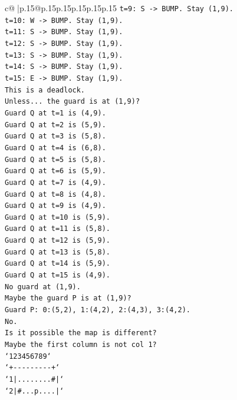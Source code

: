 \documentclass{article}
\begin{document}
{\begin{supertabular}{c@{$\;$}|p{.15\linewidth}@{}p{.15\linewidth}p{.15\linewidth}p{.15\linewidth}p{.15\linewidth}p{.15\linewidth}}
{{{\texttt{t=9: S {-}> BUMP. Stay (1,9).} \\
\texttt{t=10: W {-}> BUMP. Stay (1,9).} \\
\texttt{t=11: S {-}> BUMP. Stay (1,9).} \\
\texttt{t=12: S {-}> BUMP. Stay (1,9).} \\
\texttt{t=13: S {-}> BUMP. Stay (1,9).} \\
\texttt{t=14: S {-}> BUMP. Stay (1,9).} \\
\texttt{t=15: E {-}> BUMP. Stay (1,9).} \\
\texttt{This is a deadlock.} \\
\texttt{Unless... the guard is at (1,9)?} \\
\texttt{Guard Q at t=1 is (4,9).} \\
\texttt{Guard Q at t=2 is (5,9).} \\
\texttt{Guard Q at t=3 is (5,8).} \\
\texttt{Guard Q at t=4 is (6,8).} \\
\texttt{Guard Q at t=5 is (5,8).} \\
\texttt{Guard Q at t=6 is (5,9).} \\
\texttt{Guard Q at t=7 is (4,9).} \\
\texttt{Guard Q at t=8 is (4,8).} \\
\texttt{Guard Q at t=9 is (4,9).} \\
\texttt{Guard Q at t=10 is (5,9).} \\
\texttt{Guard Q at t=11 is (5,8).} \\
\texttt{Guard Q at t=12 is (5,9).} \\
\texttt{Guard Q at t=13 is (5,8).} \\
\texttt{Guard Q at t=14 is (5,9).} \\
\texttt{Guard Q at t=15 is (4,9).} \\
\texttt{No guard at (1,9).} \\
\texttt{Maybe the guard P is at (1,9)?} \\
\texttt{Guard P: 0:(5,2), 1:(4,2), 2:(4,3), 3:(4,2).} \\
\texttt{No.} \\
\texttt{Is it possible the map is different?} \\
\texttt{Maybe the first column is not col 1?} \\
\texttt{`123456789`} \\
\texttt{`+{-}{-}{-}{-}{-}{-}{-}{-}{-}+`} \\
\texttt{`1|........\#|`} \\
\texttt{`2|\#...p....|`} \\
}}}
\end{supertabular}}
\end{document}
